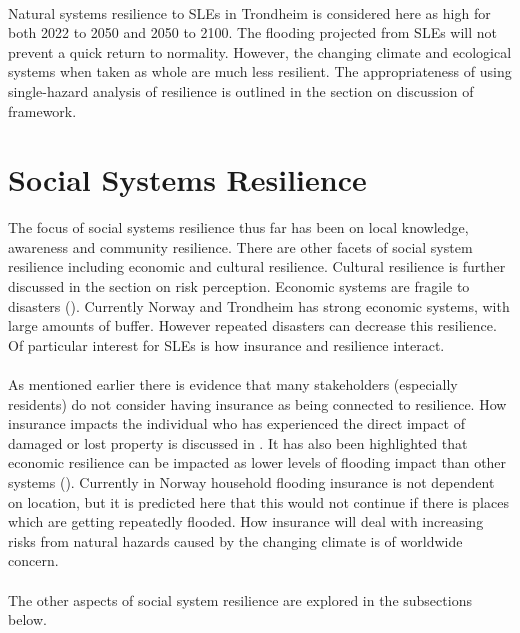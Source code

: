 \paragraph{}
Natural systems resilience to SLEs in Trondheim is considered here as high for both 2022 to 2050 and 2050 to 2100. The flooding projected from SLEs will not prevent a quick return to normality. However, the changing climate and ecological systems when taken as whole are much less resilient. The appropriateness of using single-hazard analysis of resilience is outlined in the section on discussion of framework.



\section{Social Systems Resilience}
The focus of social systems resilience thus far has been on local knowledge, awareness and community resilience. There are other facets of social system resilience including economic and cultural resilience. Cultural resilience is further discussed in the section on risk perception. Economic systems are fragile to disasters (\cite{head_comment_2020}). Currently Norway and Trondheim has strong economic systems, with large amounts of buffer. However repeated disasters can decrease this resilience. Of particular interest for SLEs is how insurance and resilience interact.
\paragraph{}
As mentioned earlier there is evidence that many stakeholders (especially residents) do not consider having insurance as being connected to resilience. How insurance impacts the individual who has experienced the direct impact of damaged or lost property is discussed in \cite{whitmarsh_are_2008}. It has also been highlighted that economic resilience can be impacted as lower levels of flooding impact than other systems (\cite{cutter_community_2020}). Currently in Norway household flooding insurance is not dependent on location, but it is predicted here that this would not continue if there is places which are getting repeatedly flooded.  How insurance will deal with increasing risks from natural hazards caused by the changing climate is of worldwide concern.

\paragraph{}
The other aspects of social system resilience are explored in the subsections below.


